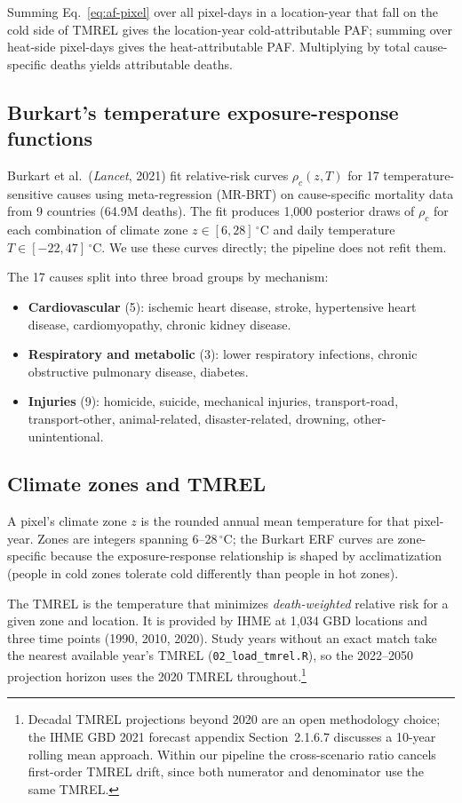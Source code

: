 \documentclass[11pt]{article}
\begin{document}
Summing Eq.~\eqref{eq:af-pixel} over all pixel-days in a location-year
that fall on the cold side of TMREL gives the location-year
cold-attributable PAF; summing over heat-side pixel-days gives the
heat-attributable PAF. Multiplying by total cause-specific deaths yields
attributable deaths.

\subsection{Burkart's temperature exposure-response functions}

Burkart et al.~(\textit{Lancet}, 2021) fit relative-risk curves
$\rho_c(z, T)$ for 17 temperature-sensitive causes using meta-regression
(MR-BRT) on cause-specific mortality data from 9 countries (64.9M
deaths). The fit produces 1,000 posterior draws of $\rho_c$ for each
combination of climate zone $z \in [6, 28]\,^{\circ}$C and daily
temperature $T \in [-22, 47]\,^{\circ}$C. We use these curves directly;
the pipeline does not refit them.

The 17 causes split into three broad groups by mechanism:
\begin{itemize}[itemsep=2pt]
  \item \textbf{Cardiovascular} (5): ischemic heart disease, stroke,
    hypertensive heart disease, cardiomyopathy, chronic kidney disease.
  \item \textbf{Respiratory and metabolic} (3): lower respiratory
    infections, chronic obstructive pulmonary disease, diabetes.
  \item \textbf{Injuries} (9): homicide, suicide, mechanical injuries,
    transport-road, transport-other, animal-related, disaster-related,
    drowning, other-unintentional.
\end{itemize}

\subsection{Climate zones and TMREL}

A pixel's climate zone $z$ is the rounded annual mean temperature for
that pixel-year. Zones are integers spanning 6--28$\,^{\circ}$C; the
Burkart ERF curves are zone-specific because the exposure-response
relationship is shaped by acclimatization (people in cold zones tolerate
cold differently than people in hot zones).

The TMREL is the temperature that minimizes \emph{death-weighted}
relative risk for a given zone and location. It is provided by IHME at
1,034 GBD locations and three time points (1990, 2010, 2020). Study years
without an exact match take the nearest available year's TMREL
(\texttt{02\_load\_tmrel.R}), so the 2022--2050 projection horizon uses
the 2020 TMREL throughout.\footnote{Decadal TMREL projections beyond 2020
are an open methodology choice; the IHME GBD 2021 forecast appendix
Section~2.1.6.7 discusses a 10-year rolling mean approach. Within our
pipeline the cross-scenario ratio cancels first-order TMREL drift, since
both numerator and denominator use the same TMREL.}
\end{document}
